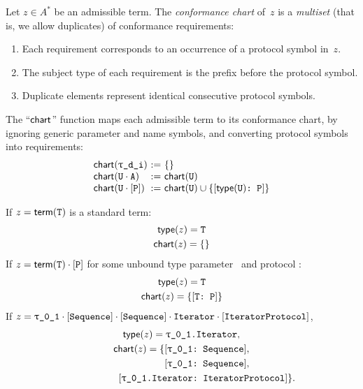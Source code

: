 \documentclass[../generics]{subfiles}
\begin{document}
\begin{definition}
Let $z\in A^*$ be an admissible term. The \emph{conformance chart} of~$z$ is a \emph{multiset} (that is, we allow duplicates) of conformance requirements:
\begin{enumerate}
\item Each requirement corresponds to an occurrence of a protocol symbol in~$z$.

\item The subject type of each requirement is the prefix before the protocol symbol.

\item Duplicate elements represent identical consecutive protocol symbols.
\end{enumerate}
\end{definition}

\begin{definition}
The ``$\mathsf{chart}$'' function maps each admissible term to its conformance chart, by ignoring generic parameter and name symbols, and converting protocol symbols into requirements:
\[
\begin{array}{l@{\ :=\ }l}
\Chart(\ttgp{d}{i})&\{\}\\
\Chart(\tU \cdot \nA)&\Chart(\tU)\\
\Chart(\tU \cdot \pP)&\Chart(\tU) \cup \{ \ConfReq{$\Type(\tU)$}{P} \}
\end{array}
\]
\end{definition}

\begin{example}
If $z=\mathsf{term}(\texttt{T})$ is a standard term:
\begin{gather*}
\mathsf{type}(z)=\texttt{T}\\
\mathsf{chart}(z)=\{\}
\end{gather*}
If $z=\mathsf{term}(\texttt{T})\cdot[\texttt{P}]$ for some unbound type parameter \tT\ and protocol \pP:
\begin{gather*}
\mathsf{type}(z)=\texttt{T}\\
\mathsf{chart}(z)=\{[\texttt{T:~P}]\}
\end{gather*}
If $z=\rU \cdot \pSequence \cdot \pSequence \cdot \nIterator \cdot \pIterator$,
\begin{gather*}
\Type(z) = \texttt{\rU.Iterator},\\
\Chart(z) = \{\rUSequence,\\
\phantom{\Chart(z) = \{}\rUSequence,\\
\phantom{\Chart(z) = \{}\ConfReq{\rU.Iterator}{IteratorProtocol}\}.
\end{gather*}
\end{example}
\end{document}
